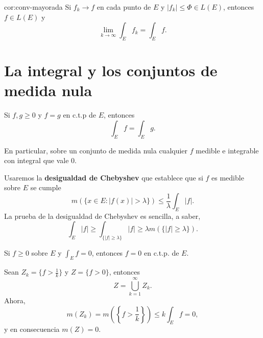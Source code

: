                     \begin{corolario}{cor:conv-mayorada}
                    Si $f_k \to f$ en cada punto de $E$ y $|f_k|\leq \Phi \in L(E)$, entonces $f \in L(E)$ y 
                    \[
                    \lim\limits_{k \to \infty}\int_E f_k = \int_E f.
                    \]
                    \end{corolario}
                    
                    
                    \section{La integral y los conjuntos de medida nula}
                    
                    Si $f,g\geq 0$ y $f=g$ en c.t.p de $E$, entonces
                    \[
                    \int_E f =\int_E g.
                    \]
                    
                    En particular, sobre un conjunto de medida nula cualquier $f$ medible e integrable  con integral que vale 0.
                    
                    Usaremos la \textbf{desigualdad de Chebyshev} que establece que si $f$ es medible sobre $E$ se cumple 
                    \[
                    m\left(\{ x\in E: |f(x)|>\lambda\}\right) \leq \frac{1}{\lambda} \int_E |f|.
                    \]
                    La prueba de la desigualdad de Chebyshev es sencilla, a saber, 
                    \[
                    \int_E |f| \geq \int_{\{|f|\geq \lambda\}} |f|
                    \geq \lambda m\left(\{|f|\geq \lambda\}\right).
                    \]
                    
                    \begin{teorema}{}
                    Si $f\geq 0$ sobre $E$ y $\int_E f=0$, entonces $f=0$ en c.t.p. de $E$.
                    \end{teorema}
                    
                    \begin{demo}
                    Sean $Z_k=\{f >\frac{1}{k}\}$ y $Z=\{f>0\}$, entonces 
                    \[
                    Z=\bigcup\limits_{k=1}^{\infty} Z_k.
                    \]
                    Ahora, 
                    \[
                    m(Z_k)=m\left(\left\{f>\frac{1}{k}\right\}\right)\leq k \int_E f=0,
                    \]
                    y en consecuencia  $m(Z)=0$.
                    \end{demo}
                    
